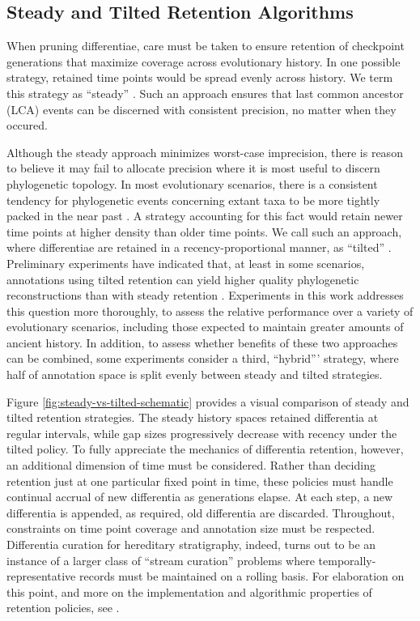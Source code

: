 \subsection{Steady and Tilted Retention Algorithms}



When pruning differentiae, care must be taken to ensure retention of checkpoint generations that maximize coverage across evolutionary history.
In one possible strategy, retained time points would be spread evenly across history.
We term this strategy as ``steady'' \citep{han2005stream,zhao2005generalized}.
Such an approach ensures that last common ancestor (LCA) events can be discerned with consistent precision, no matter when they occured.

Although the steady approach minimizes worst-case imprecision, there is reason to believe it may fail to allocate precision where it is most useful to discern phylogenetic topology.
In most evolutionary scenarios, there is a consistent tendency for phylogenetic events concerning extant taxa to be more tightly packed in the near past \citep{zhaxybayeva2004cladogenesis}.
A strategy accounting for this fact would retain newer time points at higher density than older time points.
We call such an approach, where differentiae are retained in a recency-proportional manner, as ``tilted'' \citep{han2005stream,zhao2005generalized}.
Preliminary experiments have indicated that, at least in some scenarios, annotations using tilted retention can yield higher quality phylogenetic reconstructions than with steady retention \citep{moreno2022hereditary}.
Experiments in this work addresses this question more thoroughly, to assess the relative performance over a variety of evolutionary scenarios, including those expected to maintain greater amounts of ancient history.
In addition, to assess whether benefits of these two approaches can be combined, some experiments consider a third, ``hybrid''' strategy, where half of annotation space is split evenly between steady and tilted strategies.

Figure \ref{fig:steady-vs-tilted-schematic} provides a visual comparison of steady and tilted retention strategies.
The steady history spaces retained differentia at regular intervals, while gap sizes progressively decrease with recency under the tilted policy.
To fully appreciate the mechanics of differentia retention, however, an additional dimension of time must be considered.
Rather than deciding retention just at one particular fixed point in time, these policies must handle continual accrual of new differentia as generations elapse.
At each step, a new differentia is appended, as required, old differentia are discarded.
Throughout, constraints on time point coverage and annotation size must be respected.
Differentia curation for hereditary stratigraphy, indeed, turns out to be an instance of a larger class of ``stream curation'' problems where temporally-representative records must be maintained on a rolling basis.
For elaboration on this point, and more on the implementation and algorithmic properties of retention policies, see \citet{moreno2024algorithms}.

